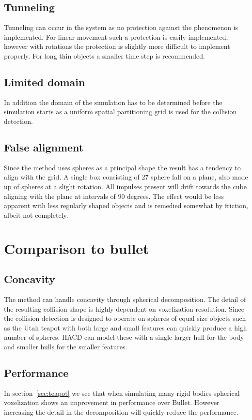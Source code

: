 \subsection{Tunneling}
Tunneling can occur in the system as no protection against the phenomenon is implemented.
For linear movement such a protection is easily implemented, however with rotations
the protection is slightly more difficult to implement properly. For long thin
objects a smaller time step is recommended.
\subsection{Limited domain}
In addition the domain of the simulation has to be determined before the simulation starts
as a uniform spatial partitioning grid is used for the collision detection.

\subsection{False alignment}
Since the method uses spheres as a principal shape the result has a tendency to align
with the grid. A single box consisting of 27 sphere fall on a plane, also made up of spheres
at a slight rotation. All impulses present will drift towards the cube aligning with the
plane at intervals of 90 degrees. The effect would be less apparent with less regularly shaped objects and
is remedied somewhat by friction, albeit not completely.

\section{Comparison to bullet}
\subsection{Concavity}
The method can handle concavity through spherical decomposition. The detail of
the resulting collision shape is highly dependent on voxelization resolution.
Since the collision detection is designed to operate on spheres of equal size
objects such as the Utah teapot with both large and small features can quickly produce
a high number of spheres. HACD can model these with a single larger hull for the body
and smaller hulls for the smaller features.

\subsection{Performance}
In section~\ref{sec:teapot} we see that when simulating many rigid bodies spherical
voxelization shows an improvement in performance over Bullet. However increasing
the detail in the decomposition will quickly reduce the performance.


